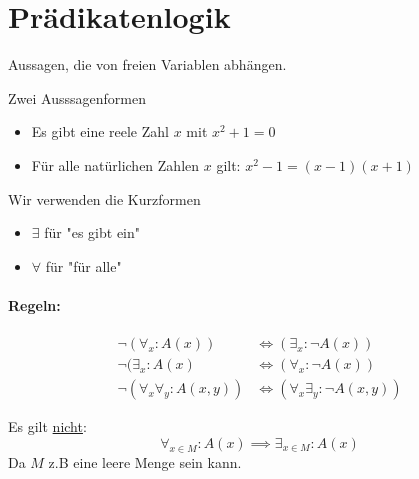 \section{Prädikatenlogik}
Aussagen, die von freien Variablen abhängen.
\begin{example}
	Zwei Ausssagenformen
\begin{itemize}
	\item Es gibt eine reele Zahl $x$ mit $x^2+1=0$
	\item Für alle natürlichen Zahlen $x$ gilt: $x^2-1=(x-1)(x+1)$ 
\end{itemize}
\end{example}
\begin{notation}[Quantoren]
	Wir verwenden die  Kurzformen
	\begin{itemize}
		\item $\exists$ für "es gibt ein"
		\item $\forall$ für "für alle" 
	\end{itemize}
\end{notation}
\paragraph{Regeln:}
\begin{align*}
	\neg(\forall_{x}: A(x)) &\iff (\exists_{x}: \neg A(x)) \\
	\neg (\exists_{x}:A(x) &\iff (\forall_{x}: \neg A(x))  \\
	\neg (\forall_{x}\forall_{y} : A(x,y)) &\iff (\forall_{x}\exists_{y}: \neg A(x,y))    
\end{align*}
\begin{warning}
Es gilt \underline{nicht}:
\[
\forall_{x \in M}: A(x) \implies \exists_{x \in M}:A(x)  
\]
Da $M$ z.B eine leere Menge sein kann.
\end{warning}
